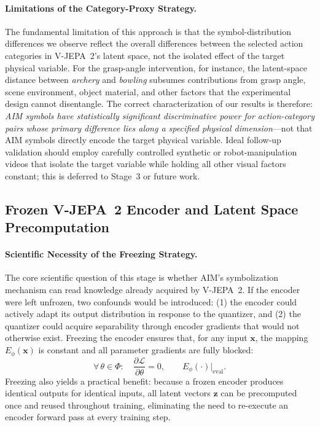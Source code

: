 \documentclass{article}
\begin{document}
\paragraph{Limitations of the Category-Proxy Strategy.}
The fundamental limitation of this approach is that the symbol-distribution
differences we observe reflect the overall differences between the selected
action categories in V-JEPA~2's latent space, not the isolated effect of the
target physical variable.  For the grasp-angle intervention, for instance, the
latent-space distance between \textit{archery} and \textit{bowling} subsumes
contributions from grasp angle, scene environment, object material, and other
factors that the experimental design cannot disentangle.  The correct
characterization of our results is therefore: \emph{AIM symbols have
statistically significant discriminative power for action-category pairs whose
primary difference lies along a specified physical dimension}---not that AIM
symbols directly encode the target physical variable.  Ideal follow-up
validation should employ carefully controlled synthetic or robot-manipulation
videos that isolate the target variable while holding all other visual factors
constant; this is deferred to Stage~3 or future work.

\subsection{Frozen V-JEPA~2 Encoder and Latent Space Precomputation}\label{sec:frozen_encoder}



\paragraph{Scientific Necessity of the Freezing Strategy.}
The core scientific question of this stage is whether AIM's symbolization
mechanism can read knowledge already acquired by V-JEPA~2.  If the encoder were
left unfrozen, two confounds would be introduced: (1) the encoder could
actively adapt its output distribution in response to the quantizer, and
(2) the quantizer could acquire separability through encoder gradients that
would not otherwise exist.  Freezing the encoder ensures that, for any input
$\mathbf{x}$, the mapping $E_\phi(\mathbf{x})$ is constant and all parameter
gradients are fully blocked:
%
\begin{equation}
  \forall\,\theta \in \Phi:\quad
  \frac{\partial \mathcal{L}}{\partial \theta} = 0,
  \qquad E_\phi(\cdot)\big|_{\text{eval}}.
\end{equation}
%
Freezing also yields a practical benefit: because a frozen encoder produces
identical outputs for identical inputs, all latent vectors $\mathbf{z}$ can be
precomputed once and reused throughout training, eliminating the need to
re-execute an encoder forward pass at every training step.
\end{document}
